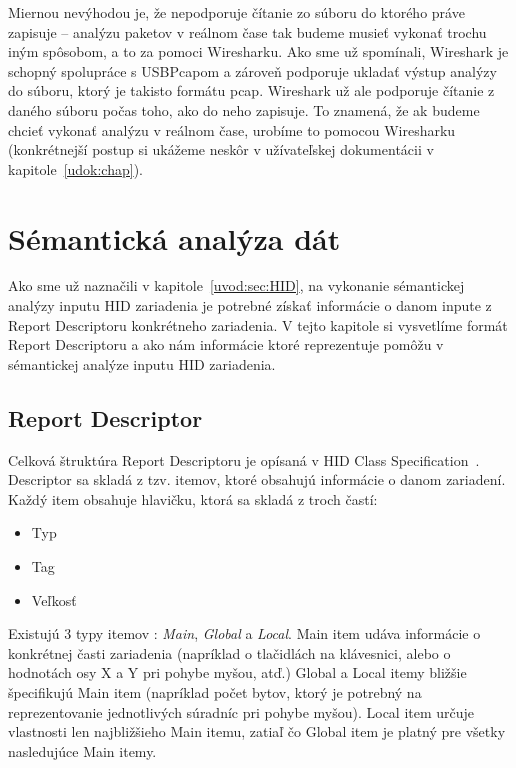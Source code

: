 Miernou nevýhodou je, že nepodporuje čítanie zo súboru do ktorého práve zapisuje -- analýzu paketov v reálnom čase tak budeme musieť vykonať trochu iným spôsobom, a to za pomoci Wiresharku. Ako sme už spomínali, Wireshark je schopný spolupráce s USBPcapom a zároveň podporuje ukladať výstup analýzy do súboru, ktorý je takisto formátu pcap. Wireshark už ale podporuje čítanie z daného súboru počas toho, ako do neho zapisuje. To znamená, že ak budeme chcieť vykonať analýzu v reálnom čase, urobíme to pomocou Wiresharku (konkrétnejší postup si ukážeme neskôr v užívateľskej dokumentácii v kapitole~\ref{udok:chap}).



\section{Sémantická analýza dát}
Ako sme už naznačili v kapitole~\ref{uvod:sec:HID}, na vykonanie sémantickej analýzy inputu HID zariadenia je potrebné získať informácie o danom inpute z Report Descriptoru konkrétneho zariadenia. V tejto kapitole si vysvetlíme formát Report Descriptoru a ako nám informácie ktoré reprezentuje pomôžu v sémantickej analýze inputu HID zariadenia.

\subsection{Report Descriptor}
Celková štruktúra Report Descriptoru je opísaná v HID Class Specification~\cite{report_desc}. Descriptor sa skladá z tzv. itemov, ktoré obsahujú informácie o danom zariadení. Každý item obsahuje hlavičku, ktorá sa skladá z troch častí:
\begin{itemize}
\item Typ
\item Tag
\item Veľkosť
\end{itemize}

Existujú 3 typy itemov : \textit{Main}, \textit{Global} a \textit{Local}. Main item udáva informácie o konkrétnej časti zariadenia (napríklad o tlačidlách na klávesnici, alebo o hodnotách osy X a Y pri pohybe myšou, atď.) Global a Local itemy bližšie špecifikujú Main item (napríklad počet bytov, ktorý je potrebný na reprezentovanie jednotlivých súradníc pri pohybe myšou). Local item určuje vlastnosti len najbližšieho Main itemu, zatiaľ čo Global item je platný pre všetky nasledujúce Main itemy.

